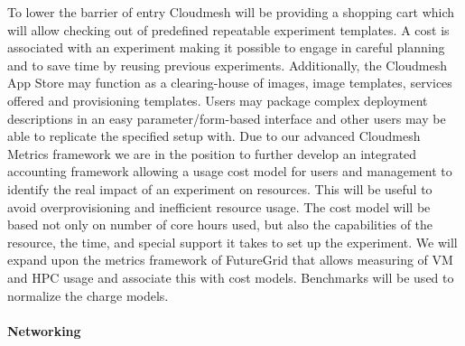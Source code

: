 \documentclass{tex/sig-alternate}
\begin{document}
To lower the barrier of entry Cloudmesh will be providing a shopping cart which will allow checking out of predefined repeatable experiment templates. A cost is associated with an experiment making it possible to engage in careful planning and to save time by reusing previous experiments. Additionally, the Cloudmesh App Store may function as a clearing-house of images, image templates, services offered and provisioning templates. Users may package complex deployment descriptions in an easy parameter/form-based interface and other users may be able to replicate the specified setup with.
Due to our advanced Cloudmesh Metrics framework we are in the position to further develop an integrated accounting framework allowing a usage cost model for users and management to identify the real impact of an experiment on resources. This will be useful to avoid overprovisioning and inefficient resource usage. The cost model will be based not only on number of core hours used, but also the capabilities of the resource, the time, and special support it takes to set up the experiment. We will expand upon the metrics framework of FutureGrid that allows measuring of VM and HPC usage and associate this with cost models. Benchmarks will be used to normalize the charge models.


\paragraph{Networking}
\end{document}
